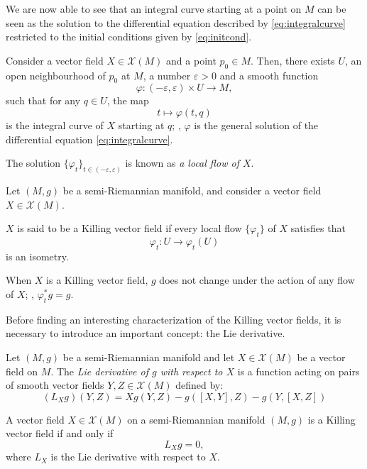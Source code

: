 We are now able to see that an integral curve starting at a point on $M$ can be seen as the solution to the differential equation described by \autoref{eq:integralcurve} restricted to the initial conditions given by \autoref{eq:initcond}.

\begin{lemma}
	Consider a vector field $X \in \mathcal{X}(M)$ and a point $p_0 \in M$. Then, there exists $U$, an open neighbourhood of $p_0$ at $M$, a number $\varepsilon > 0$ and a smooth function
	\[
		\varphi \colon (-\varepsilon, \varepsilon) \times U \to M,
	\]
	such that for any $q \in U$, the map
	\[
		t \mapsto \varphi(t,q)
	\]
	is the integral curve of $X$ starting at $q$; \ie, $\varphi$ is the general solution of the differential equation \ref{eq:integralcurve}.
	
	The solution $\{\varphi_t\}_{t \in (-\varepsilon, \varepsilon)}$ is known as \emph{a local flow of $X$}.
\end{lemma}

\begin{definition}
	Let $(M,g)$ be a semi-Riemannian manifold, and consider a vector field $X\in\mathcal{X}(M)$.
	
	$X$ is said to be a Killing vector field if every local flow $\{\varphi_t\}$ of $X$ satisfies that
	\[
		\varphi_t \colon U \to \varphi_t(U)
	\]
	is an isometry.
\end{definition}

When $X$ is a Killing vector field, $g$ does not change under the action of any flow of $X$; \ie, $\varphi^*_t g = g$.

Before finding an interesting characterization of the Killing vector fields, it is necessary to introduce an important concept: the Lie derivative.

\begin{definition}
	Let $(M,g)$ be a semi-Riemannian manifold and let $X\in\mathcal{X}(M)$ be a vector field on $M$. The \emph{Lie derivative of $g$ with respect to $X$} is a function acting on pairs of smooth vector fields $Y,Z \in \mathcal{X}(M)$ defined by:
	\begin{equation}
	\label{eq:liederivative}
		(L_Xg)(Y,Z) = Xg(Y,Z) - g([X,Y],Z) - g(Y,[X,Z])
	\end{equation}
\end{definition}

\begin{proposition}
	\label{pro:killingchar}
	A vector field $X \in \mathcal{X}(M)$ on a semi-Riemannian manifold $(M,g)$ is a Killing vector field if and only if
	\[
		L_X g = 0,
	\]
	where $L_X$ is the Lie derivative with respect to $X$.
\end{proposition}

